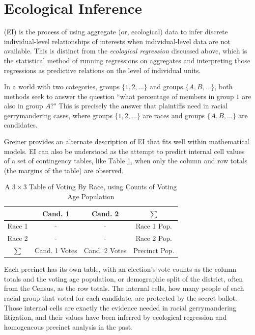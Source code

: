 \section{Ecological Inference}

 (EI) is the process of using aggregate (or, ecological) data to infer discrete individual-level relationships of interests when individual-level data are not available.\cite{king1999} This is distinct from the \textit{ecological regression} discussed above, which is the statistical method of running regressions on aggregates and interpreting those regressions as predictive relations on the level of individual units.\cite{ec_reg}

In a world with two categories, groups $\{1, 2, \dots \}$ and groups $\{A, B, \dots \}$, both methods seek to answer the question ``what percentage of members in group $1$ are also in group $A$?" This is precisely the answer that plaintiffs need in racial gerrymandering cases, where groups $\{1, 2, \dots \}$ are races and groups $\{A, B, \dots \}$ are candidates.

Greiner provides an alternate description of EI that fits well within mathematical models.\cite{greiner} EI can also be understood as the attempt to predict internal cell values of a set of contingency tables, like Table \ref{table:ei_example}, when only the column and row totals (the margins of the table) are observed.

\begin{table}
 \centering
 \caption{A $3 \times 3$ Table of Voting By Race, using Counts of Voting Age Population}
 \label{table:ei_example}
 \begin{tabular}{cccc}\toprule
         & Cand. 1       & Cand. 2       & $\sum$        \\\midrule
  Race 1 &      -         &       -        & Race 1 Pop.   \\
  Race 2 &     -          &      -         & Race 2 Pop.   \\
  $\sum$ & Cand. 1 Votes & Cand. 2 Votes & Precinct Pop.
 \end{tabular}
\end{table}

Each precinct has its own table, with an election's vote counts as the column totals and the voting age population, or demographic split of the district, often from the Census, as the row totals. The internal cells, how many people of each racial group that voted for each candidate, are protected by the secret ballot. Those internal cells are exactly the evidence needed in racial gerrymandering litigation, and their values have been inferred by ecological regression and homogeneous precinct analysis in the past.

